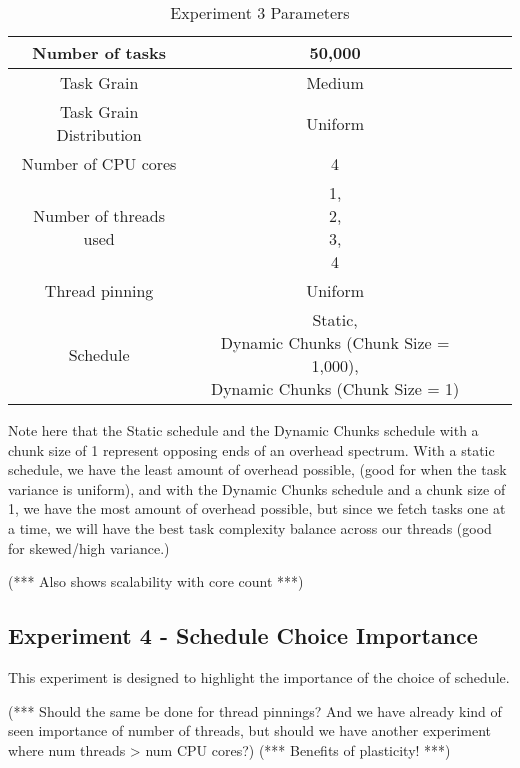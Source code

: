 \begin{table}
\centering
	\begin{tabular}{|c|c|c|c|}
		\hline
		Number of tasks & 50,000 \\
		\hline
		Task Grain & Medium \\
		\hline
		Task Grain Distribution & Uniform \\
		\hline
		Number of CPU cores & 4 \\
		\hline
		Number of threads used & \specialcell{1, \\ 2, \\ 3, \\ 4} \\
		\hline
		Thread pinning & Uniform \\
		\hline
		Schedule & \specialcell{Static, \\ Dynamic Chunks (Chunk Size = 1,000), \\ Dynamic Chunks (Chunk Size = 1)} \\
		\hline
	\end{tabular}
\caption{Experiment 3 Parameters}
\label{table:ex3_parameters}
\end{table}



Note here that the Static schedule and the Dynamic Chunks schedule with a chunk size of 1 represent opposing ends of an overhead spectrum. With a static schedule, we have the least amount of overhead possible, (good for when the task variance is uniform), and with the Dynamic Chunks schedule and a chunk size of 1, we have the most amount of overhead possible, but since we fetch tasks one at a time, we will have the best task complexity balance across our threads (good for skewed/high variance.)

(*** Also shows scalability with core count ***)



\subsection{Experiment 4 - Schedule Choice Importance}

This experiment is designed to highlight the importance of the choice of schedule.

(*** Should the same be done for thread pinnings? And we have already kind of seen importance of number of threads, but should we have another experiment where num threads > num CPU cores?)
(*** Benefits of plasticity! ***)


